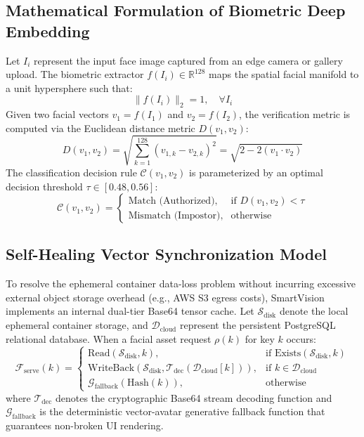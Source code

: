 \documentclass[conference]{IEEEtran}
\begin{document}
\subsection{Mathematical Formulation of Biometric Deep Embedding}
Let $I_i$ represent the input face image captured from an edge camera or gallery upload. The biometric extractor $f(I_i) \in \mathbb{R}^{128}$ maps the spatial facial manifold to a unit hypersphere such that:
\begin{equation}
\|f(I_i)\|_2 = 1, \quad \forall I_i
\end{equation}
Given two facial vectors $v_1 = f(I_1)$ and $v_2 = f(I_2)$, the verification metric is computed via the Euclidean distance metric $D(v_1, v_2)$:
\begin{equation}
D(v_1, v_2) = \sqrt{\sum_{k=1}^{128} (v_{1,k} - v_{2,k})^2} = \sqrt{2 - 2 (v_1 \cdot v_2)}
\end{equation}
The classification decision rule $\mathcal{C}(v_1, v_2)$ is parameterized by an optimal decision threshold $\tau \in [0.48, 0.56]$:
\begin{equation}
\mathcal{C}(v_1, v_2) = 
\begin{cases} 
\text{Match (Authorized)}, & \text{if } D(v_1, v_2) < \tau \\ 
\text{Mismatch (Impostor)}, & \text{otherwise}
\end{cases}
\end{equation}

\subsection{Self-Healing Vector Synchronization Model}
To resolve the ephemeral container data-loss problem without incurring excessive external object storage overhead (e.g., AWS S3 egress costs), SmartVision implements an internal dual-tier Base64 tensor cache.
Let $\mathcal{S}_{\text{disk}}$ denote the local ephemeral container storage, and $\mathcal{D}_{\text{cloud}}$ represent the persistent PostgreSQL relational database. When a facial asset request $\rho(k)$ for key $k$ occurs:
\begin{equation}
\mathcal{F}_{\text{serve}}(k) = 
\begin{cases}
\text{Read}(\mathcal{S}_{\text{disk}}, k), & \text{if } \text{Exists}(\mathcal{S}_{\text{disk}}, k) \\
\text{WriteBack}(\mathcal{S}_{\text{disk}}, \mathcal{T}_{\text{dec}}(\mathcal{D}_{\text{cloud}}[k])), & \text{if } k \in \mathcal{D}_{\text{cloud}} \\
\mathcal{G}_{\text{fallback}}(\text{Hash}(k)), & \text{otherwise}
\end{cases}
\end{equation}
where $\mathcal{T}_{\text{dec}}$ denotes the cryptographic Base64 stream decoding function and $\mathcal{G}_{\text{fallback}}$ is the deterministic vector-avatar generative fallback function that guarantees non-broken UI rendering.
\end{document}
